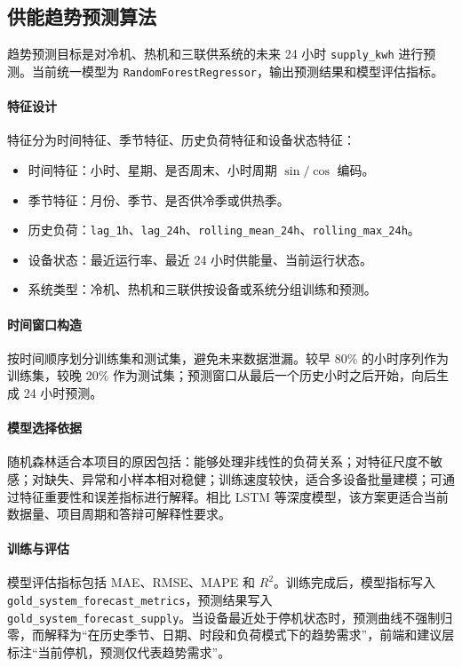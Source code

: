 \documentclass[UTF8,11pt,a4paper]{ctexart}
\newcommand{\code}[1]{\texttt{#1}}
\begin{document}
\subsection{供能趋势预测算法}

趋势预测目标是对冷机、热机和三联供系统的未来 24 小时 \code{supply\_kwh} 进行预测。当前统一模型为 \code{RandomForestRegressor}，输出预测结果和模型评估指标。

\paragraph{特征设计}
特征分为时间特征、季节特征、历史负荷特征和设备状态特征：

\begin{itemize}
  \item 时间特征：小时、星期、是否周末、小时周期 \(\sin/\cos\) 编码。
  \item 季节特征：月份、季节、是否供冷季或供热季。
  \item 历史负荷：\code{lag\_1h}、\code{lag\_24h}、\code{rolling\_mean\_24h}、\code{rolling\_max\_24h}。
  \item 设备状态：最近运行率、最近 24 小时供能量、当前运行状态。
  \item 系统类型：冷机、热机和三联供按设备或系统分组训练和预测。
\end{itemize}

\paragraph{时间窗口构造}
按时间顺序划分训练集和测试集，避免未来数据泄漏。较早 80\% 的小时序列作为训练集，较晚 20\% 作为测试集；预测窗口从最后一个历史小时之后开始，向后生成 24 小时预测。

\paragraph{模型选择依据}
随机森林适合本项目的原因包括：能够处理非线性的负荷关系；对特征尺度不敏感；对缺失、异常和小样本相对稳健；训练速度较快，适合多设备批量建模；可通过特征重要性和误差指标进行解释。相比 LSTM 等深度模型，该方案更适合当前数据量、项目周期和答辩可解释性要求。

\paragraph{训练与评估}
模型评估指标包括 MAE、RMSE、MAPE 和 \(R^2\)。训练完成后，模型指标写入 \code{gold\_system\_forecast\_metrics}，预测结果写入 \code{gold\_system\_forecast\_supply}。当设备最近处于停机状态时，预测曲线不强制归零，而解释为“在历史季节、日期、时段和负荷模式下的趋势需求”，前端和建议层标注“当前停机，预测仅代表趋势需求”。
\end{document}

